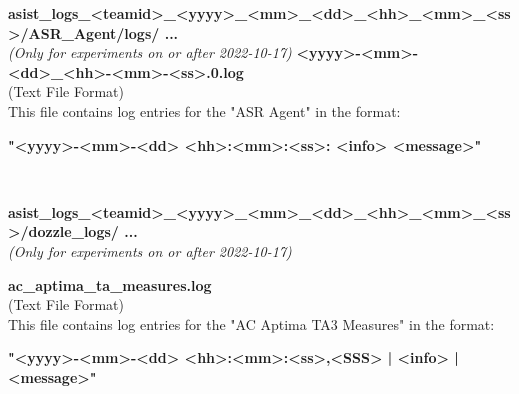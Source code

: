 \begin{description}
\label{ASR Agent logs}
\begin{addmargin}[0em]{0em} %
    \textbf{asist\_logs\_<teamid>\_<yyyy>\_<mm>\_<dd>\_<hh>\_<mm>\_<ss>/ASR\_Agent/logs/ ...}\\
    \textit{(Only for experiments on or after 2022-10-17)}
        \label{ASR Agent logs <yyyy>-<mm>-<dd>_<hh>-<mm>-<ss>.0.log}
        \textbf{<yyyy>-<mm>-<dd>\_<hh>-<mm>-<ss>.0.log}\\
        (Text File Format)\\
        This file contains log entries for the "ASR Agent" in the format:
        \begin{addmargin}[1em]{0em}
            \textbf{"<yyyy>-<mm>-<dd> <hh>:<mm>:<ss>: <info> <message>"}
        \end{addmargin}
\end{addmargin} %
\textbf{\\}
\begin{addmargin}[0em]{0em} %
    \textbf{asist\_logs\_<teamid>\_<yyyy>\_<mm>\_<dd>\_<hh>\_<mm>\_<ss>/dozzle\_logs/ ...}\\
    \textit{(Only for experiments on or after 2022-10-17)}

    \label{ac_aptima_ta3_measures.log}
    \begin{addmargin}[1em]{0em} %
        \textbf{ac\_aptima\_ta\_measures.log}\\
        (Text File Format)\\
        This file contains log entries for the "AC Aptima TA3 Measures" in the format:
        \begin{addmargin}[1em]{0em}
            \textbf{"<yyyy>-<mm>-<dd> <hh>:<mm>:<ss>,<SSS> | <info> | <message>"}
        \end{addmargin}
    \end{addmargin} %
    \textbf{\\}


\end{addmargin}
\end{description}
